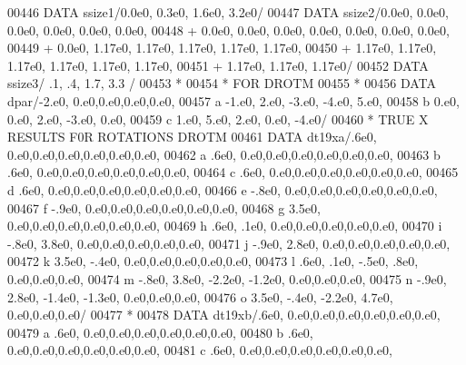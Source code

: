 \begin{DoxyCode}
00446       \textcolor{keyword}{DATA}              ssize1/0.0e0, 0.3e0, 1.6e0, 3.2e0/
00447       \textcolor{keyword}{DATA}              ssize2/0.0e0, 0.0e0, 0.0e0, 0.0e0, 0.0e0, 0.0e0,
00448      +                  0.0e0, 0.0e0, 0.0e0, 0.0e0, 0.0e0, 0.0e0, 0.0e0,
00449      +                  0.0e0, 1.17e0, 1.17e0, 1.17e0, 1.17e0, 1.17e0,
00450      +                  1.17e0, 1.17e0, 1.17e0, 1.17e0, 1.17e0, 1.17e0,
00451      +                  1.17e0, 1.17e0, 1.17e0/
00452       \textcolor{keyword}{DATA}              ssize3/ .1, .4, 1.7, 3.3 /
00453 \textcolor{comment}{*}
00454 \textcolor{comment}{*                         FOR DROTM}
00455 \textcolor{comment}{*}
00456       \textcolor{keyword}{DATA} dpar/-2.e0,  0.e0,0.e0,0.e0,0.e0,
00457      a          -1.e0,  2.e0, -3.e0, -4.e0,  5.e0,
00458      b           0.e0,  0.e0,  2.e0, -3.e0,  0.e0,
00459      c           1.e0,  5.e0,  2.e0,  0.e0, -4.e0/
00460 \textcolor{comment}{*                        TRUE X RESULTS F0R ROTATIONS DROTM}
00461       \textcolor{keyword}{DATA} dt19xa/.6e0,                  0.e0,0.e0,0.e0,0.e0,0.e0,0.e0,
00462      a            .6e0,                  0.e0,0.e0,0.e0,0.e0,0.e0,0.e0,
00463      b            .6e0,                  0.e0,0.e0,0.e0,0.e0,0.e0,0.e0,
00464      c            .6e0,                  0.e0,0.e0,0.e0,0.e0,0.e0,0.e0,
00465      d            .6e0,                  0.e0,0.e0,0.e0,0.e0,0.e0,0.e0,
00466      e           -.8e0,                  0.e0,0.e0,0.e0,0.e0,0.e0,0.e0,
00467      f           -.9e0,                  0.e0,0.e0,0.e0,0.e0,0.e0,0.e0,
00468      g           3.5e0,                  0.e0,0.e0,0.e0,0.e0,0.e0,0.e0,
00469      h            .6e0,   .1e0,             0.e0,0.e0,0.e0,0.e0,0.e0,
00470      i           -.8e0,  3.8e0,             0.e0,0.e0,0.e0,0.e0,0.e0,
00471      j           -.9e0,  2.8e0,             0.e0,0.e0,0.e0,0.e0,0.e0,
00472      k           3.5e0,  -.4e0,             0.e0,0.e0,0.e0,0.e0,0.e0,
00473      l            .6e0,   .1e0,  -.5e0,   .8e0,          0.e0,0.e0,0.e0,
00474      m           -.8e0,  3.8e0, -2.2e0, -1.2e0,          0.e0,0.e0,0.e0,
00475      n           -.9e0,  2.8e0, -1.4e0, -1.3e0,          0.e0,0.e0,0.e0,
00476      o           3.5e0,  -.4e0, -2.2e0,  4.7e0,          0.e0,0.e0,0.e0/
00477 \textcolor{comment}{*}
00478       \textcolor{keyword}{DATA} dt19xb/.6e0,                  0.e0,0.e0,0.e0,0.e0,0.e0,0.e0,
00479      a            .6e0,                  0.e0,0.e0,0.e0,0.e0,0.e0,0.e0,
00480      b            .6e0,                  0.e0,0.e0,0.e0,0.e0,0.e0,0.e0,
00481      c            .6e0,                  0.e0,0.e0,0.e0,0.e0,0.e0,0.e0,

\end{DoxyCode}
